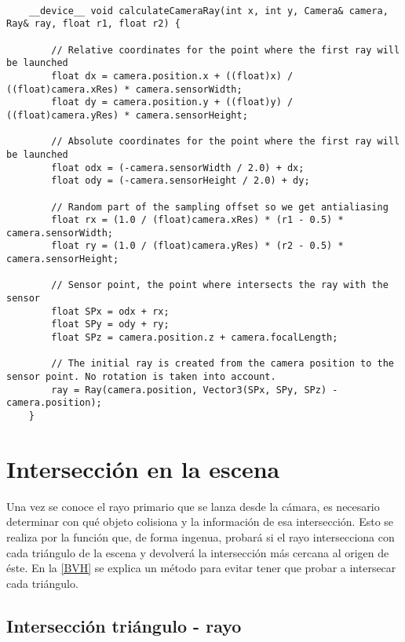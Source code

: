 \begin{minipage}[c]{0.95\textwidth}
\begin{lstlisting}[label={cod:cameraray}, caption={Trazado de rayo a cámara}]
	
	__device__ void calculateCameraRay(int x, int y, Camera& camera, Ray& ray, float r1, float r2) {

		// Relative coordinates for the point where the first ray will be launched
		float dx = camera.position.x + ((float)x) / ((float)camera.xRes) * camera.sensorWidth;
		float dy = camera.position.y + ((float)y) / ((float)camera.yRes) * camera.sensorHeight;

		// Absolute coordinates for the point where the first ray will be launched
		float odx = (-camera.sensorWidth / 2.0) + dx;
		float ody = (-camera.sensorHeight / 2.0) + dy;

		// Random part of the sampling offset so we get antialiasing
		float rx = (1.0 / (float)camera.xRes) * (r1 - 0.5) * camera.sensorWidth;
		float ry = (1.0 / (float)camera.yRes) * (r2 - 0.5) * camera.sensorHeight;

		// Sensor point, the point where intersects the ray with the sensor
		float SPx = odx + rx;
		float SPy = ody + ry;
		float SPz = camera.position.z + camera.focalLength;

		// The initial ray is created from the camera position to the sensor point. No rotation is taken into account.
		ray = Ray(camera.position, Vector3(SPx, SPy, SPz) - camera.position);
	}

\end{lstlisting}
\end{minipage}
	
\section{Intersección en la escena}
\label{sec:throwray}

Una vez se conoce el rayo primario que se lanza desde la cámara, es necesario determinar con qué objeto colisiona y la información de esa intersección. Esto se realiza por la función  que, de forma ingenua, probará si el rayo intersecciona con cada triángulo de la escena y devolverá la intersección más cercana al origen de éste. En la \autoref{BVH} se explica un método para evitar tener que probar a intersecar cada triángulo.

\subsection{Intersección triángulo - rayo}
\label{subsec:triintersection}
	
